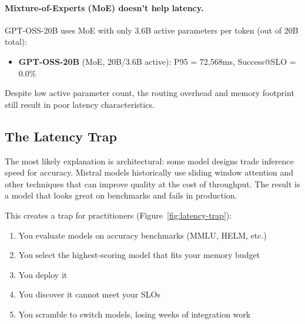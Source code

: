 \documentclass[11pt]{article}
\begin{document}
\paragraph{Mixture-of-Experts (MoE) doesn't help latency.}
GPT-OSS-20B uses MoE with only 3.6B active parameters per token (out of 20B total):
\begin{itemize}[leftmargin=12pt]
    \item \textbf{GPT-OSS-20B} (MoE, 20B/3.6B active): P95 = 72,568ms, Success@SLO = 0.0\%
\end{itemize}
Despite low active parameter count, the routing overhead and memory footprint still result in poor latency characteristics.

\subsection{The Latency Trap}
The most likely explanation is architectural: some model designs trade inference speed for accuracy.
Mistral models historically use sliding window attention and other techniques that can improve quality at the cost of throughput.
The result is a model that looks great on benchmarks and fails in production.

This creates a trap for practitioners (Figure~\ref{fig:latency-trap}):
\begin{enumerate}[leftmargin=12pt]
    \item You evaluate models on accuracy benchmarks (MMLU, HELM, etc.)
    \item You select the highest-scoring model that fits your memory budget
    \item You deploy it
    \item You discover it cannot meet your SLOs
    \item You scramble to switch models, losing weeks of integration work
\end{enumerate}
\end{document}
